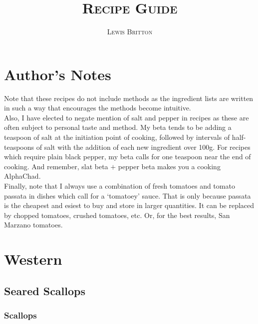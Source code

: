\documentclass[11pt, english]{article}
\begin{document}

	\title{\huge\textsc{Recipe Guide}}
	\author{\Large\textsc{Lewis Britton}}
	\date{}
	\maketitle

	\renewcommand{\contentsname}{Table of Contents}

	\tableofcontents

\newpage


\section{Author's Notes}

	Note that these recipes do not include methods as the ingredient lists are written in such a way that encourages the methods become intuitive.\\

	Also, I have elected to negate mention of salt and pepper in recipes as these are often subject to personal taste and method. My beta tends to be adding a teaspoon of salt at the initiation point of cooking, followed by intervals of half-teaspoons of salt with the addition of each new ingredient over 100g. For recipes which require plain black pepper, my beta calls for one teaspoon near the end of cooking. And remember, slat beta $+$ pepper beta makes you a cooking AlphaChad.\\

	Finally, note that I always use a combination of fresh tomatoes and tomato passata in dishes which call for a `tomatoey' sauce. That is only because passata is the cheapest and esiest to buy and store in larger quantities. It can be replaced by chopped tomatoes, crushed tomatoes, etc. Or, for the best results, San Marzano tomatoes.

\newpage

\section{Western}

	\subsection{Seared Scallops}

		\subsubsection*{Scallops}
\end{document}
